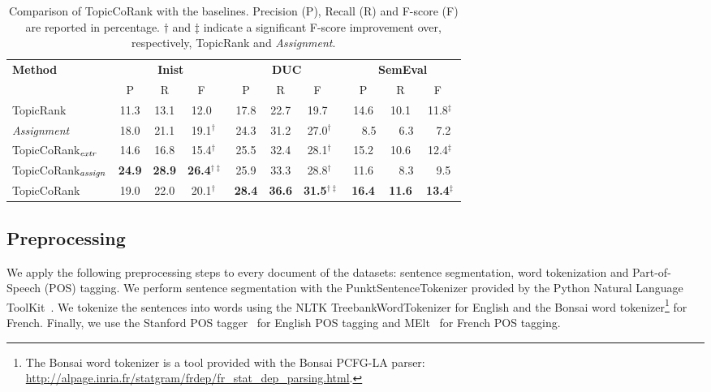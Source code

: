   \begin{table*}
    \centering
      \begin{tabular}{l|ccc@{}|ccc@{}|ccc@{~}}
        \toprule
        \multirow{2}{*}{\textbf{Method}} & \multicolumn{3}{c|}{\textbf{Inist}} & \multicolumn{3}{c|}{\textbf{DUC}} & \multicolumn{3}{c}{\textbf{SemEval}}\\
        \cline{2-10}
        & P & R & F$^{~~~~}$ & P & R & F$^{~~~~}$ & P & R & F$^{~~}$\\
        \hline
        TopicRank & 11.3 & 13.1 & 12.0$^{~~~~}$ & 17.8 & 22.7 & 19.7$^{~~~~}$ & 14.6 & 10.1 & 11.8$^{\ddagger}$\\
        \textit{Assignment} & 18.0 & 21.1 & 19.1$^{\dagger~~}$ & 24.3 & 31.2 & 27.0$^{\dagger~~}$ & ~~8.5 & ~~6.3 & ~~7.2$^{~~}$\\
        \hline
        TopicCoRank$_\textnormal{\textit{extr}}$ & 14.6 & 16.8 & 15.4$^{\dagger~~}$ & 25.5 & 32.4 & 28.1$^{\dagger~~}$ & 15.2 & 10.6 & 12.4$^{\ddagger}$\\
        TopicCoRank$_\textnormal{\textit{assign}}$ & \textbf{24.9} & \textbf{28.9} & \textbf{26.4$^{\dagger\ddagger}$} & 25.9 & 33.3 & 28.8$^{\dagger~~}$ & 11.6 & ~~8.3 & ~~9.5$^{~~}$\\
        \hline
        TopicCoRank & 19.0 & 22.0 & 20.1$^{\dagger~~}$ & \textbf{28.4} & \textbf{36.6} & \textbf{31.5$^{\dagger\ddagger}$} & \textbf{16.4} & \textbf{11.6} & \textbf{13.4$^{\ddagger}$}\\
        \bottomrule
      \end{tabular}
    \caption{Comparison of TopicCoRank with the baselines. Precision (P), Recall
             (R) and F-score (F) are reported in percentage. $\dagger$ and $\ddagger$
             indicate a significant F-score improvement over, respectively, TopicRank and
             \textit{Assignment}.
             \label{tab:comparison_results}}
  \end{table*}

  \subsection{Preprocessing}
  \label{subsec:preprocessing}
    We apply the following preprocessing steps to every document of the
    datasets: sentence segmentation, word tokenization and Part-of-Speech (POS)
    tagging. We perform sentence segmentation with the PunktSentenceTokenizer
    provided by the Python Natural Language ToolKit~\cite[NLTK]{bird2009nltk}.
    We tokenize the sentences into words using the NLTK TreebankWordTokenizer for
    English and the Bonsai word tokenizer\footnote{The Bonsai word tokenizer is
    a tool provided with the Bonsai PCFG-LA parser:
    \url{http://alpage.inria.fr/statgram/frdep/fr_stat_dep_parsing.html}.} for
    French. Finally, we use the Stanford POS
    tagger~\cite{toutanova2003stanfordpostagger} for English POS tagging and
    MElt~\cite{denis2009melt} for French POS tagging.

